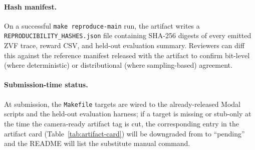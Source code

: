 \paragraph{Hash manifest.}
On a successful \texttt{make reproduce-main} run, the artifact writes a
\texttt{REPRODUCIBILITY\_HASHES.json} file containing SHA-256 digests of
every emitted ZVF trace, reward CSV, and held-out evaluation summary.
Reviewers can diff this against the reference manifest released with the
artifact to confirm bit-level (where deterministic) or distributional
(where sampling-based) agreement.

\paragraph{Submission-time status.}
At submission, the \texttt{Makefile} targets are wired to the
already-released Modal scripts and the held-out evaluation harness; if a
target is missing or stub-only at the time the camera-ready artifact tag
is cut, the corresponding entry in the artifact card
(Table~\ref{tab:artifact-card}) will be downgraded from \checkmark{} to
``pending'' and the README will list the substitute manual command.
